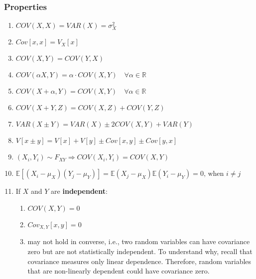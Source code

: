 \subsubsection*{Properties}
\begin{enumerate}
    \item $COV(X, X) = VAR(X) = \sigma_X^2$ 
    \hfill \cite{ism-1}

    \item $Cov[x, x] = V_X[x]$ 
    \hfill \cite{mfml-1}

    \item $COV(X, Y) = COV(Y, X)$ 
    \hfill \cite{ism-1}

    \item $
        COV(\alpha X, Y) = \alpha \cdot COV(X, Y) 
        \quad \forall \alpha \in \mathbb{R}
    $ 
    \hfill \cite{ism-1}

    \item $
        COV(X + \alpha, Y) = COV(X, Y) 
        \quad \forall \alpha \in \mathbb{R}
    $ 
    \hfill \cite{ism-1}

    \item $COV(X + Y, Z) = COV(X, Z) + COV(Y, Z)$ 
    \hfill \cite{ism-1}

    \item $VAR(X \pm Y) = VAR(X) \pm 2COV(X, Y) + VAR(Y)$ 
    \hfill \cite{ism-1}

    \item $V[x \pm y] = V[x] + V[y] \pm Cov[x, y] \pm Cov[y, x]$ 
    \hfill \cite{mfml-1}

    \item $
        (X_i, Y_i) \sim F_{XY}
        \Rightarrow 
        COV(X_i, Y_i) = COV(X, Y)$ 
    \hfill \cite{ism-1}

    \item $
        \mathbb{E}[(X_i - \mu_X)(Y_j - \mu_Y)] 
        = \mathbb{E}(X_j - \mu_X)\mathbb{E}(Y_i - \mu_Y) 
        = 0  \text{, when } i \neq j
    $
    \hfill \cite{ism-1}

    \item If $X$ and $Y$ are \textbf{independent}:
    \begin{enumerate}
        \item $COV(X, Y) = 0$ \hfill \cite{ism-1}
        
        \item $Cov_{X,Y}[x, y] = 0$ \hfill \cite{mfml-1}

        \item may not hold in converse, i.e., two random variables can have covariance zero but are not statistically independent. To understand why, recall that covariance measures only linear dependence. Therefore, random variables that are non-linearly dependent could have covariance zero. \cite{mfml-1}
        

\end{enumerate}
\end{enumerate}
